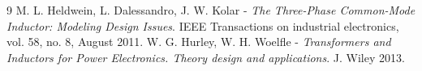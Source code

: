 \documentclass[11pt,a4paper]{scrartcl}
\numberwithin{equation}{section}
\theoremstyle{it}
\theoremstyle{definition}
\begin{document}
\begin{onehalfspace}
	\newpage
	\begin{thebibliography}{9}
		M. L. Heldwein, L. Dalessandro, J. W. Kolar - \emph{The Three-Phase Common-Mode Inductor: Modeling Design Issues}. IEEE Transactions on industrial electronics, vol. 58, no. 8, August 2011.
		W. G. Hurley, W. H. Woelfle - \emph{Transformers and Inductors for Power Electronics. Theory design and applications}. J. Wiley 2013.
	\end{thebibliography}
	
\end{onehalfspace}
\end{document}
